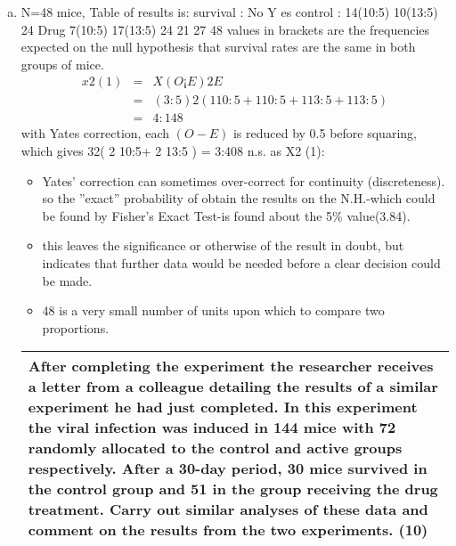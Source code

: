 \documentclass[a4paper,12pt]{article}
\begin{document}
\begin{enumerate}[(a)]
\item N=48 mice, Table of results is:
survival : No Y es
control : 14(10:5) 10(13:5) 24
Drug 7(10:5) 17(13:5) 24
21 27 48
values in brackets are the frequencies expected on the null hypothesis that survival rates
are the same in both groups of mice.
\begin{eqnarray*}x2
(1) &=&
X(O ¡ E)2
E
\\ &=& (3:5)2(
1
10:5
+
1
10:5
+
1
13:5
+
1
13:5
) \\ &=&  4:148
\end{eqnarray*}
with Yates correction, each $(O-E)$ is reduced by 0.5 before squaring, which gives 32( 2
10:5+
2
13:5 ) = 3:408 n.s. as X2
(1):
\begin{itemize}
    \item Yates’ correction can sometimes over-correct for continuity (discreteness). so the ”exact”
probability of obtain the results on the N.H.-which could be found by Fisher’s
Exact Test-is found about the 5\% value(3.84). 
\item this leaves the significance or otherwise
of the result in doubt, but indicates that further data would be needed before a clear
decision could be made. 
\item 48 is a very small number of units upon which to compare two
proportions.
\end{itemize}

\begin{table}[ht!]
     

\centering
     

\begin{tabular}{|p{15cm}|}
     

\hline 


After completing the experiment the researcher receives a letter from a colleague detailing the results of a similar experiment he had just completed.  In this experiment the viral infection was induced in 144 mice with 72 randomly allocated to the control and active groups respectively.  After a 30-day period, 30 mice survived in the control group and 51 in the group receiving the drug treatment.  Carry out similar analyses of these data and comment on the results from the two experiments. (10) 

\\ \hline


\end{tabular}
    


\end{table}
\end{enumerate}
\end{document}
